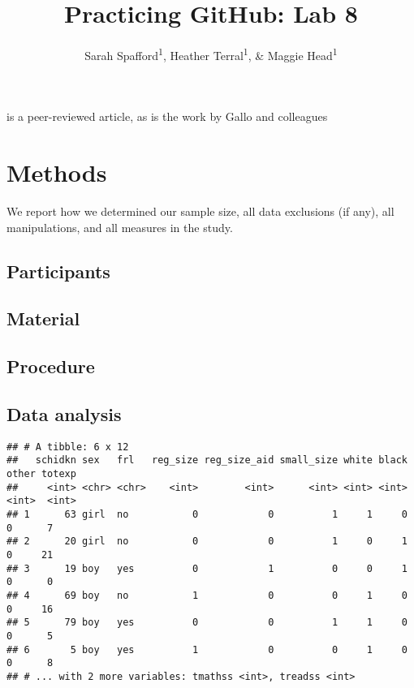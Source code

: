\documentclass[
  english,
  man]{apa6}
\title{Practicing GitHub: Lab 8}
\author{Sarah Spafford\textsuperscript{1}, Heather Terral\textsuperscript{1}, \& Maggie Head\textsuperscript{1}}
\date{}
\affiliation{\vspace{0.5cm}\textsuperscript{1} University of Oregon}
\begin{document}
\maketitle

\textcite{benham2010} is a peer-reviewed article, as is the work by Gallo and colleagues \autocite*{gallo2014}

\hypertarget{methods}{%
\section{Methods}\label{methods}}

We report how we determined our sample size, all data exclusions (if any), all manipulations, and all measures in the study.

\hypertarget{participants}{%
\subsection{Participants}\label{participants}}

\hypertarget{material}{%
\subsection{Material}\label{material}}

\hypertarget{procedure}{%
\subsection{Procedure}\label{procedure}}

\hypertarget{data-analysis}{%
\subsection{Data analysis}\label{data-analysis}}

\begin{verbatim}
## # A tibble: 6 x 12
##   schidkn sex   frl   reg_size reg_size_aid small_size white black other totexp
##     <int> <chr> <chr>    <int>        <int>      <int> <int> <int> <int>  <int>
## 1      63 girl  no           0            0          1     1     0     0      7
## 2      20 girl  no           0            0          1     0     1     0     21
## 3      19 boy   yes          0            1          0     0     1     0      0
## 4      69 boy   no           1            0          0     1     0     0     16
## 5      79 boy   yes          0            0          1     1     0     0      5
## 6       5 boy   yes          1            0          0     1     0     0      8
## # ... with 2 more variables: tmathss <int>, treadss <int>
\end{verbatim}
\end{document}
